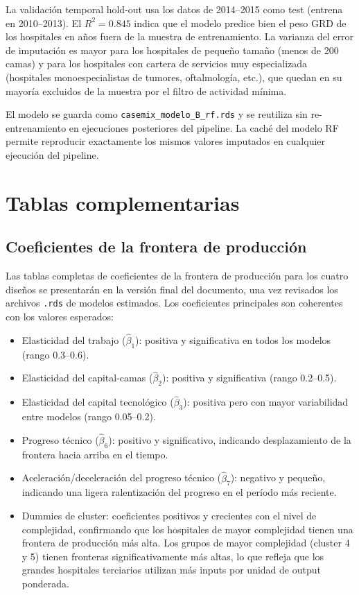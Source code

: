 \documentclass[12pt, a4paper, twoside, openright]{book}
\theoremstyle{plain}
\theoremstyle{definition}
\theoremstyle{remark}
\begin{document}
La validación temporal hold-out usa los datos de 2014--2015 como test (entrena en 2010--2013). El $R^2 = 0.845$ indica que el modelo predice bien el peso GRD de los hospitales en años fuera de la muestra de entrenamiento. La varianza del error de imputación es mayor para los hospitales de pequeño tamaño (menos de 200 camas) y para los hospitales con cartera de servicios muy especializada (hospitales monoespecialistas de tumores, oftalmología, etc.), que quedan en su mayoría excluidos de la muestra por el filtro de actividad mínima.

El modelo se guarda como \texttt{casemix\_modelo\_B\_rf.rds} y se reutiliza sin re-entrenamiento en ejecuciones posteriores del pipeline. La caché del modelo RF permite reproducir exactamente los mismos valores imputados en cualquier ejecución del pipeline.


\chapter{Tablas complementarias}
\label{app:tablas}

\section{Coeficientes de la frontera de producción}

Las tablas completas de coeficientes de la frontera de producción para los cuatro diseños se presentarán en la versión final del documento, una vez revisados los archivos \texttt{.rds} de modelos estimados. Los coeficientes principales son coherentes con los valores esperados:
\begin{itemize}
  \item Elasticidad del trabajo ($\hat{\beta}_1$): positiva y significativa en todos los modelos (rango 0.3--0.6).
  \item Elasticidad del capital-camas ($\hat{\beta}_2$): positiva y significativa (rango 0.2--0.5).
  \item Elasticidad del capital tecnológico ($\hat{\beta}_3$): positiva pero con mayor variabilidad entre modelos (rango 0.05--0.2).
  \item Progreso técnico ($\hat{\beta}_6$): positivo y significativo, indicando desplazamiento de la frontera hacia arriba en el tiempo.
  \item Aceleración/deceleración del progreso técnico ($\hat{\beta}_7$): negativo y pequeño, indicando una ligera ralentización del progreso en el período más reciente.
  \item Dummies de cluster: coeficientes positivos y crecientes con el nivel de complejidad, confirmando que los hospitales de mayor complejidad tienen una frontera de producción más alta. Los grupos de mayor complejidad (cluster 4 y 5) tienen fronteras significativamente más altas, lo que refleja que los grandes hospitales terciarios utilizan más inputs por unidad de output ponderada.
\end{itemize}
\end{document}
